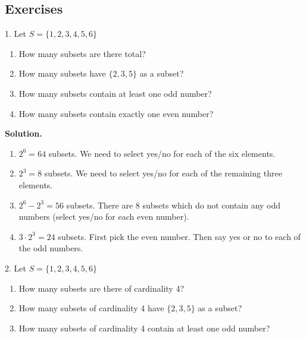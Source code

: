 \documentclass[10pt,]{book}
\theoremstyle{plain}
\theoremstyle{definition}
\theoremstyle{definition}
\theoremstyle{definition}
\numberwithin{equation}{section}
\begin{document}
\subsection[Exercises]{Exercises}\label{exercises-5}
\begin{exerciselist}
\item[1.]\hypertarget{exercise-50}{}
            Let \(S = \{1, 2, 3, 4, 5, 6\}\)
\leavevmode%
\begin{enumerate}[label=(\alph*)]
\item\hypertarget{li-424}{} How many subsets are there total? %
\item\hypertarget{li-425}{} How many subsets have \(\{2,3,5\}\) as a subset? %
\item\hypertarget{li-426}{} How many subsets contain at least one odd number? %
\item\hypertarget{li-427}{} How many subsets contain exactly one even number? %
\end{enumerate}
\par\smallskip
\par\smallskip
\noindent\textbf{Solution.}\hypertarget{solution-76}{}\quad
\leavevmode%
\begin{enumerate}[label=(\alph*)]
\item\hypertarget{li-428}{}\(2^6 = 64\) subsets. We need to select yes/no for each of the six elements.%
\item\hypertarget{li-429}{}\(2^3 = 8\) subsets.  We need to select yes/no for each of the remaining three elements.%
\item\hypertarget{li-430}{}\(2^6 - 2^3 = 56\) subsets.  There are 8 subsets which do not contain any odd numbers (select yes/no for each even number).%
\item\hypertarget{li-431}{}\(3\cdot 2^3 = 24\) subsets.  First pick the even number.  Then say yes or no to each of the odd numbers.%
\end{enumerate}
\item[2.]\hypertarget{exercise-51}{}
            Let \(S = \{1, 2, 3, 4, 5, 6\}\)
\leavevmode%
\begin{enumerate}[label=(\alph*)]
\item\hypertarget{li-432}{} How many subsets are there of cardinality 4? %
\item\hypertarget{li-433}{} How many subsets of cardinality 4 have \(\{2,3,5\}\) as a subset? %
\item\hypertarget{li-434}{} How many subsets of cardinality 4 contain at least one odd number? %

\end{enumerate}
\end{exerciselist}
\end{document}
